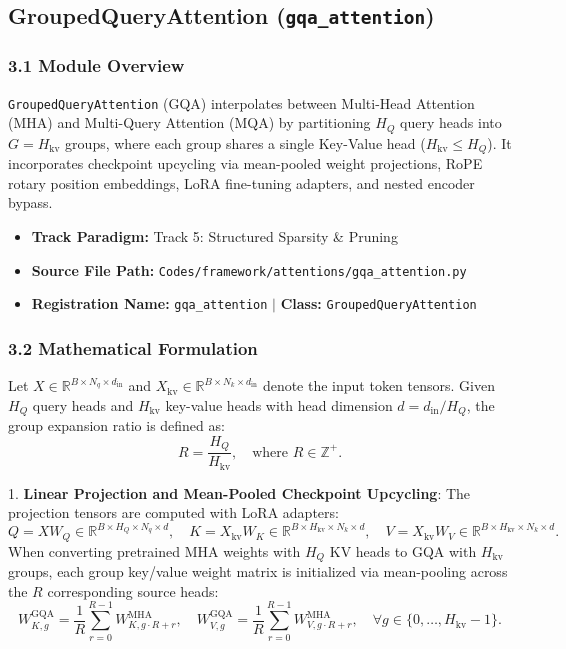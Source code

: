 \subsection{GroupedQueryAttention (\texttt{gqa\_attention})}
\label{sec:app_module_gqa_attention}

\subsubsection*{3.1 Module Overview}
\texttt{GroupedQueryAttention} (GQA) interpolates between Multi-Head Attention (MHA) and Multi-Query Attention (MQA) by partitioning $H_Q$ query heads into $G = H_{\text{kv}}$ groups, where each group shares a single Key-Value head ($H_{\text{kv}} \le H_Q$). It incorporates checkpoint upcycling via mean-pooled weight projections, RoPE rotary position embeddings, LoRA fine-tuning adapters, and nested encoder bypass.
\begin{itemize}
    \item \textbf{Track Paradigm:} Track 5: Structured Sparsity \& Pruning
    \item \textbf{Source File Path:} \texttt{Codes/framework/attentions/gqa\_attention.py}
    \item \textbf{Registration Name:} \texttt{gqa\_attention} $\mid$ \textbf{Class:} \texttt{GroupedQueryAttention}
\end{itemize}

\subsubsection*{3.2 Mathematical Formulation}
Let $X \in \mathbb{R}^{B \times N_q \times d_{\text{in}}}$ and $X_{\text{kv}} \in \mathbb{R}^{B \times N_k \times d_{\text{in}}}$ denote the input token tensors. Given $H_Q$ query heads and $H_{\text{kv}}$ key-value heads with head dimension $d = d_{\text{in}} / H_Q$, the group expansion ratio is defined as:
\begin{equation}
R = \frac{H_Q}{H_{\text{kv}}}, \quad \text{where } R \in \mathbb{Z}^+.
\end{equation}

1. \textbf{Linear Projection and Mean-Pooled Checkpoint Upcycling}:
The projection tensors are computed with LoRA adapters:
\begin{equation}
Q = X W_Q \in \mathbb{R}^{B \times H_Q \times N_q \times d}, \quad K = X_{\text{kv}} W_K \in \mathbb{R}^{B \times H_{\text{kv}} \times N_k \times d}, \quad V = X_{\text{kv}} W_V \in \mathbb{R}^{B \times H_{\text{kv}} \times N_k \times d}.
\end{equation}
When converting pretrained MHA weights with $H_Q$ KV heads to GQA with $H_{\text{kv}}$ groups, each group key/value weight matrix is initialized via mean-pooling across the $R$ corresponding source heads:
\begin{equation}
W_{K, g}^{\text{GQA}} = \frac{1}{R} \sum_{r=0}^{R-1} W_{K, g \cdot R + r}^{\text{MHA}}, \quad W_{V, g}^{\text{GQA}} = \frac{1}{R} \sum_{r=0}^{R-1} W_{V, g \cdot R + r}^{\text{MHA}}, \quad \forall g \in \{0, \dots, H_{\text{kv}} - 1\}.
\end{equation}

